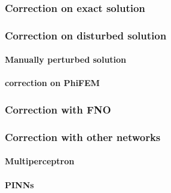 \subsubsection{Correction on exact solution} \label{Corr.results.ana}


\subsubsection{Correction on disturbed solution} \label{Corr.results.disturbed}

\paragraph{Manually perturbed solution}
\paragraph{correction on PhiFEM}

\subsubsection{Correction with FNO} \label{Corr.results.FNO}

\subsubsection{Correction with other networks} \label{Corr.results.neural_net}
\paragraph{Multiperceptron}
\paragraph{PINNs}